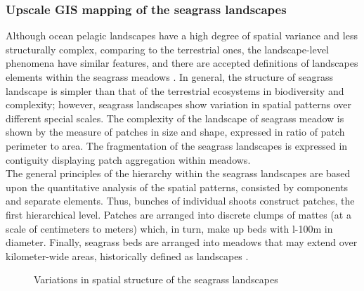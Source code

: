\documentclass[11pt]{article}
\begin{document}
\subsubsection{Upscale GIS mapping of the seagrass landscapes}
Although ocean pelagic landscapes have a high degree of spatial variance and less structurally
complex, comparing to the terrestrial ones, the landscape-level phenomena have similar features, and
there are accepted definitions of landscapes elements within the seagrass meadows \cite{Robbins94}\label{Robbins94}. 
In general, the structure of seagrass landscape is simpler than that of the terrestrial
ecosystems in biodiversity and complexity; however, seagrass landscapes show variation in spatial
patterns over different special scales. The complexity of the landscape of seagrass meadow is shown by the
measure of patches in size and shape, expressed in ratio of patch perimeter to area. The fragmentation
of the seagrass landscapes is expressed in contiguity displaying patch aggregation within meadows.\\
The general principles of the hierarchy within the seagrass landscapes are based upon the quantitative
analysis of the spatial patterns, consisted by components and separate elements. Thus, bunches of
individual shoots construct patches, the first hierarchical level. Patches are arranged into discrete
clumps of mattes (at a scale of centimeters to meters) which, in turn, make up beds with l-100m in
diameter. Finally, seagrass beds are arranged into meadows that may extend over kilometer-wide
areas, historically defined as landscapes \cite{Robbins94}\label{Robbins94}.

\begin{figure}[h]
	\centering
	\caption{Variations in spatial structure of the seagrass landscapes}
	\label{fig:41}
\end{figure}
\end{document}
